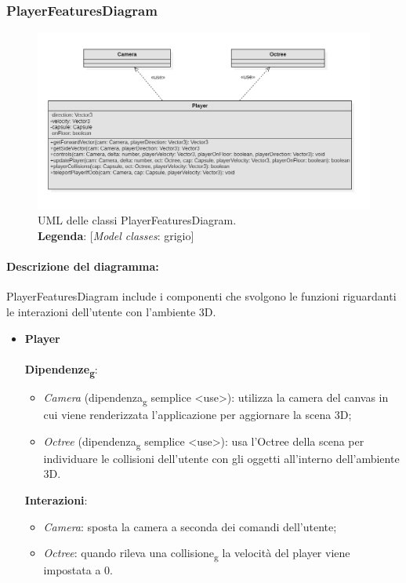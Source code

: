 		\subsubsection{PlayerFeaturesDiagram}
		\begin{figure}[H]
			\centering
			\includegraphics[scale=0.6, keepaspectratio]{./res/images/playerFeaturesDiagram.PNG}
			\caption[UML delle classi PlayerFeaturesDiagram]{
				UML delle classi PlayerFeaturesDiagram.
				\\
				\textbf{Legenda}: 
				[\textit{Model classes}: grigio]}
			\end{figure}
		\paragraph*{Descrizione del diagramma:}
		PlayerFeaturesDiagram include i componenti che svolgono le funzioni riguardanti le interazioni dell'utente con 
		l'ambiente 3D.
\begin{itemize}
		\item \textbf{Player}
		\\\\
		\textbf{Dipendenze\textsubscript{g}}:
		\begin{itemize}
			\item \textit{Camera} (dipendenza\textsubscript{g} semplice \textless use\textgreater): utilizza la camera del canvas in cui viene renderizzata l'applicazione
			 per aggiornare la scena 3D;
			\item \textit{Octree} (dipendenza\textsubscript{g} semplice \textless use\textgreater): usa l'Octree della scena per individuare le collisioni dell'utente con 
			gli oggetti all'interno dell'ambiente 3D.
		\end{itemize}
		\textbf{Interazioni}:
		\begin{itemize}
			\item \textit{Camera}: sposta la camera a seconda dei comandi dell'utente;
			\item \textit{Octree}: quando rileva una collisione\textsubscript{g} la velocità del player viene impostata a 0. 
		\end{itemize}
\end{itemize}

